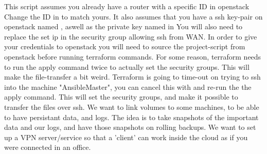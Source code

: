\markdownRendererInterblockSeparator
{}\markdownRendererInterblockSeparator
{}This script assumes you already have a router with a specific ID in openstack\markdownRendererLineBreak
{}Change the ID in  to match yours.\markdownRendererLineBreak
{}It also assumes that you have a ssh key-pair on openstack named ,\markdownRendererLineBreak
{}aswell as the private key named  in  You will also need to replace the set ip in the security group allowing ssh from WAN.\markdownRendererInterblockSeparator
{}In order to give your credentials to openstack\markdownRendererLineBreak
{}you will need to source the project-script from openstack before running terraform commands.\markdownRendererInterblockSeparator
{}\markdownRendererInterblockSeparator
{}\markdownRendererInterblockSeparator
{}\markdownRendererInterblockSeparator
{}\markdownRendererInterblockSeparator
{}\markdownRendererInterblockSeparator
{}For some reason, terraform needs to run the apply command twice to actually set the security groups. \markdownRendererInterblockSeparator
{}This will make the file-transfer a bit weird.\markdownRendererLineBreak
{}Terraform is going to time-out on trying to ssh into the machine "AnsibleMaster",\markdownRendererLineBreak
{}you can cancel this with  and re-run the the apply command. \markdownRendererInterblockSeparator
{}This will set the security groups, and make it possible to transfer the files over ssh. \markdownRendererInterblockSeparator
{}\markdownRendererInterblockSeparator
{}\markdownRendererInterblockSeparator
{}\markdownRendererInterblockSeparator
{}\markdownRendererInterblockSeparator
{}We want to link volumes to some machines, to be able to have persistant data, and logs.\markdownRendererLineBreak
{}The idea is to take snapshots of the important data and our logs,\markdownRendererLineBreak
{}and have those snapshots on rolling backups.\markdownRendererInterblockSeparator
{}\markdownRendererInterblockSeparator
{}We want to set up a VPN server/service so that a 'client'\markdownRendererLineBreak
{}can work inside the cloud as if you were connected in an office.\relax